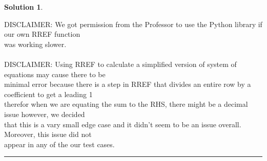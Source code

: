 \documentclass{article}
\theoremstyle{definition}
\def\fline{\rule{0.75\linewidth}{0.5pt}}
\newcommand{\finishline}{\vspace{-15pt}\begin{center}\fline\end{center}}
\newtheorem*{solution*}{Solution}
\newenvironment{solution}{\begin{solution*}}{{\finishline} \end{solution*}}
\begin{document}
\begin{solution}
\begin{tabbing}
    \> DISCLAIMER: We got permission from the Professor to use the Python library if our own RREF function\\ \>was working slower.\\\\
    \> DISCLAIMER: Using RREF to calculate a simplified version of system of equations may cause there to be\\ \>minimal error because there is a step in RREF that divides an entire row by a coefficient to get a leading 1\\ \>therefor when we are equating the sum to the RHS, there might be a decimal issue however, we decided\\ \>that this is a vary small edge case and it didn't seem to be an issue overall. Moreover, this issue did not\\ \>appear in any of the our test cases.
	\end{tabbing}
\end{solution}
\smallskip
\end{document}
